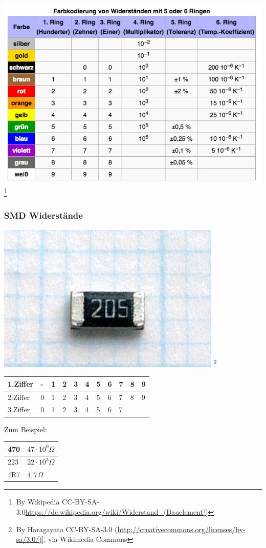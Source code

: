\begin{frame}
	\begin{center}
        \includegraphics[width=1\textwidth]{e04/5-Ringe.png}
        \footnote{\tiny By Wikipedia CC-BY-SA-3.0\url{https://de.wikipedia.org/wiki/Widerstand_(Bauelement)}]}
\end{center}
\end{frame}

\begin{frame}
    \frametitle{SMD Widerstände}
    \begin{center}
        \includegraphics[width=.3\textwidth]{e04/Rsistor_SMD.jpg}
        \footnote{\tiny By Haragayato CC-BY-SA-3.0 (\url{http://creativecommons.org/licenses/by-sa/3.0/)}], via Wikimedia Commons}
    \end{center}
    
    \begin{center}
    \begin{tabular}{l||l|l|l|l|l|l|l|l|l|l}\hline
        1.Ziffer & - & 1 &2 & 3 & 4 & 5 & 6 & 7 & 8 & 9 \\ \hline
        2.Ziffer & 0 & 1 &2 & 3 & 4 & 5 & 6 & 7 & 8 & 9 \\ \hline
        3.Ziffer & 0 & 1 &2 & 3 & 4 & 5 & 6 & 7 &  &  \\ \hline
    \end{tabular}
    \end{center}
    Zum Beispiel:
    \begin{center}
    \begin{tabular}{l||l}\hline
        470 & $47 \cdot 10^{0} \Omega$ \\ \hline
        223 & $22 \cdot 10^{3} \Omega$ \\ \hline
        4R7 & $4,7 \Omega$ \\ \hline
    \end{tabular}
    \end{center}

\end{frame}

